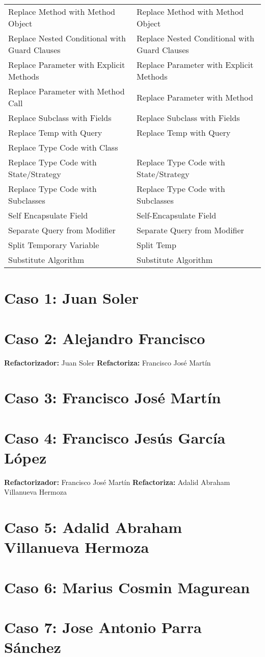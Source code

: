 \documentclass[11pt,a4paper,oneside]{book}
\begin{document}
\begin{longtable}{|p{200pt}|p{200pt}|}
    Replace Method with Method Object & Replace Method with Method Object\\ 
    Replace Nested Conditional with Guard Clauses & Replace Nested Conditional with Guard Clauses\\ 
    Replace Parameter with Explicit Methods & Replace Parameter with Explicit Methods\\ 
    Replace Parameter with Method Call & Replace Parameter with Method\\ 
    Replace Subclass with Fields & Replace Subclass with Fields\\ 
    Replace Temp with Query & Replace Temp with Query\\ 
    Replace Type Code with Class & \\ 
    Replace Type Code with State/Strategy & Replace Type Code with State/Strategy\\ 
    Replace Type Code with Subclasses & Replace Type Code with Subclasses\\ 
    Self Encapsulate Field & Self-Encapsulate Field\\ 
    Separate Query from Modifier & Separate Query from Modifier\\ 
    Split Temporary Variable & Split Temp\\ 
    Substitute Algorithm &     Substitute Algorithm\\
\end{longtable}





\chapter{Caso 1: Juan Soler}


\chapter{Caso 2: Alejandro Francisco}
\textbf{Refactorizador:} Juan Soler
\textbf{Refactoriza:} Francisco José Martín


\chapter {Caso 3: Francisco José Martín}


\chapter {Caso 4: Francisco Jesús García López}
\textbf{Refactorizador:} Francisco José Martín
\textbf{Refactoriza:} Adalid Abraham Villanueva Hermoza 



\chapter {Caso 5: Adalid Abraham Villanueva Hermoza}


\chapter {Caso 6: Marius Cosmin Magurean}

\chapter {Caso 7: Jose Antonio Parra Sánchez}
\end{document}
